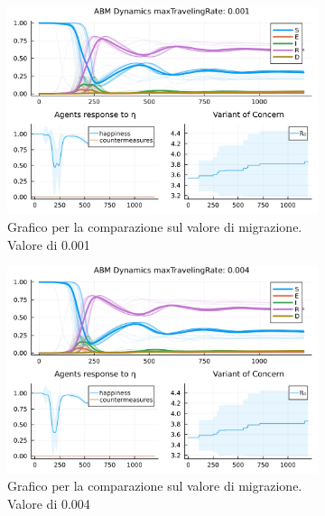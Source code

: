 \begin{figure}[!hb]
	\centering
	\begin{subfigure}[b]{0.45\textwidth}
		\centering
		\includegraphics[width=\textwidth]{img/SocialNetworkABM_1_MTR.jpg}
		\caption{Grafico per la comparazione sul valore di migrazione. Valore di 0.001}
		\label{fig:comparison_maxTravelingRate_low}
	\end{subfigure}
	\hfill
	\begin{subfigure}[b]{0.45\textwidth}
		\centering
		\includegraphics[width=\textwidth]{img/SocialNetworkABM_2_MTR.jpg}
		\caption{Grafico per la comparazione sul valore di migrazione. Valore di 0.004}
		\label{fig:comparison_maxTravelingRate_midl}
	\end{subfigure}
	\hfill
	\begin{subfigure}[b]{0.45\textwidth}
		\centering

\end{subfigure}
\end{figure}
